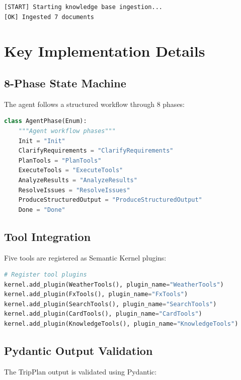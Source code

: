 \documentclass[11pt,a4paper]{article}
\begin{document}
\begin{lstlisting}[basicstyle=\ttfamily\small]
[START] Starting knowledge base ingestion...
[OK] Ingested 7 documents
\end{lstlisting}

\newpage

\section{Key Implementation Details}

\subsection{8-Phase State Machine}

The agent follows a structured workflow through 8 phases:

\begin{lstlisting}[language=Python]
class AgentPhase(Enum):
    """Agent workflow phases"""
    Init = "Init"
    ClarifyRequirements = "ClarifyRequirements"
    PlanTools = "PlanTools"
    ExecuteTools = "ExecuteTools"
    AnalyzeResults = "AnalyzeResults"
    ResolveIssues = "ResolveIssues"
    ProduceStructuredOutput = "ProduceStructuredOutput"
    Done = "Done"
\end{lstlisting}

\subsection{Tool Integration}

Five tools are registered as Semantic Kernel plugins:

\begin{lstlisting}[language=Python]
# Register tool plugins
kernel.add_plugin(WeatherTools(), plugin_name="WeatherTools")
kernel.add_plugin(FxTools(), plugin_name="FxTools")
kernel.add_plugin(SearchTools(), plugin_name="SearchTools")
kernel.add_plugin(CardTools(), plugin_name="CardTools")
kernel.add_plugin(KnowledgeTools(), plugin_name="KnowledgeTools")
\end{lstlisting}

\subsection{Pydantic Output Validation}

The TripPlan output is validated using Pydantic:
\end{document}
